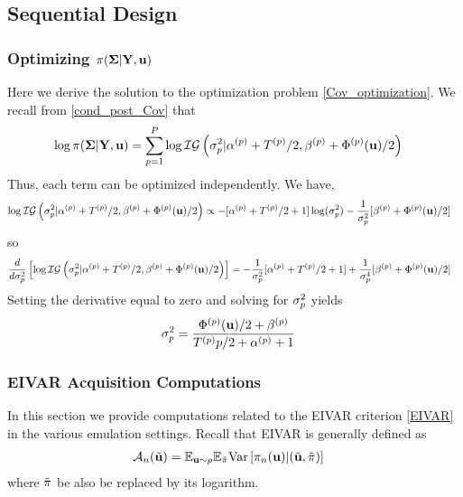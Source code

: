 \documentclass[12pt]{article}
\begin{document}
\subsection{Sequential Design}
\subsubsection{Optimizing $\postDens(\CovObs|\stateMat, \bpar)$}
Here we derive the solution to the optimization problem \ref{Cov_optimization}. We recall from \ref{cond_post_Cov} that 
\begin{align*}
\log \postDens(\CovObs|\stateMat, \bpar) &= \sum_{\objIdx = 1}^{\Nobj} \log \mathcal{IG}\left(\sdObs_{\objIdx}^2|\indexObj{\IGShape} + \indexObj{\Ntime}/2, \indexObj{\IGScale} + \indexObj{\SSR}(\bpar)/2 \right)
\end{align*}
Thus, each term can be optimized independently. We have, 
\begin{align*}
\log \mathcal{IG}\left(\sdObs_{\objIdx}^2|\indexObj{\IGShape} + \indexObj{\Ntime}/2, \indexObj{\IGScale} + \indexObj{\SSR}(\bpar)/2 \right) &\propto -[\indexObj{\IGShape} + \indexObj{\Ntime}/2 + 1]\log(\sdObs^2_{\objIdx})
																									       - \frac{1}{\sdObs^2_{\objIdx}} [\indexObj{\IGScale} + \indexObj{\SSR}(\bpar)/2]
\end{align*}
so 
\begin{align*}
\frac{d}{d\sdObs_{\objIdx}^2}\left[\log \mathcal{IG}\left(\sdObs_{\objIdx}^2|\indexObj{\IGShape} + \indexObj{\Ntime}/2, \indexObj{\IGScale} + \indexObj{\SSR}(\bpar)/2 \right)\right] &= -\frac{1}{\sdObs_{\objIdx}^2}[\indexObj{\IGShape} + \indexObj{\Ntime}/2 + 1] + \frac{1}{\sdObs_{\objIdx}^4} [\indexObj{\IGScale} + \indexObj{\SSR}(\bpar)/2]
\end{align*}
Setting the derivative equal to zero and solving for $\sdObs^2_{\objIdx}$ yields
\begin{align*}
\sdObs_{\objIdx}^2 &= \frac{\indexObj{\SSR}(\bpar)/2 + \indexObj{\IGScale}}{\indexObj{\Ntime}{\objIdx}/2 + \indexObj{\IGShape} + 1}
\end{align*}


\subsubsection{EIVAR Acquisition Computations}
In this section we provide computations related to the EIVAR criterion \ref{EIVAR} in the various emulation settings. Recall that EIVAR is generally defined as 
\begin{align*}
\acq[\designIdx](\tilde{\bpar}) &= \E_{\bpar \sim \rho} \E_{\tilde{\postDens}} \Var\left[\postDens_{\designIdx}(\bpar) | (\tilde{\bpar}, \tilde{\postDens}) \right] 
\end{align*}
where $\tilde{\postDens}$ be also be replaced by its logarithm. 
\end{document}
